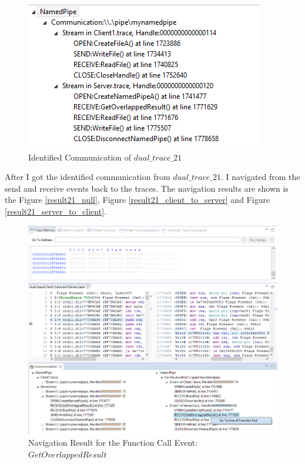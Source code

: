 \begin{figure}[H]
\centerline{\includegraphics[scale=0.5]{Figures/result21_communications}}
 \caption{Identified Communication of $dual\_trace\_21$}
\label{result21_communications}
\end{figure}

After I got the identified communication from $dual\_trace\_21$. I navigated from the send and receive events back to the traces. The navigation results are shown is the Figure \ref{result21_null},  Figure \ref{result21_client_to_server} and Figure \ref{result21_server_to_client}.

\begin{figure}[H]
\centerline{\includegraphics[scale=0.35]{Figures/result21_server_readnull}}
 \caption{Navigation Result for the Function Call Event: $GetOverlappedResult$}
\label{result21_server_readnull}
\end{figure}

